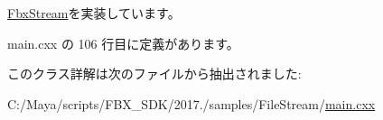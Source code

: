 \hyperlink{class_fbx_stream_a0bd0142e0acd244bc4342381c28b7a9a}{Fbx\+Stream}を実装しています。



 main.\+cxx の 106 行目に定義があります。



このクラス詳解は次のファイルから抽出されました\+:\begin{DoxyCompactItemize}
\item 
C\+:/\+Maya/scripts/\+F\+B\+X\+\_\+\+S\+D\+K/2017./samples/\+File\+Stream/\hyperlink{_file_stream_2main_8cxx}{main.\+cxx}\end{DoxyCompactItemize}
